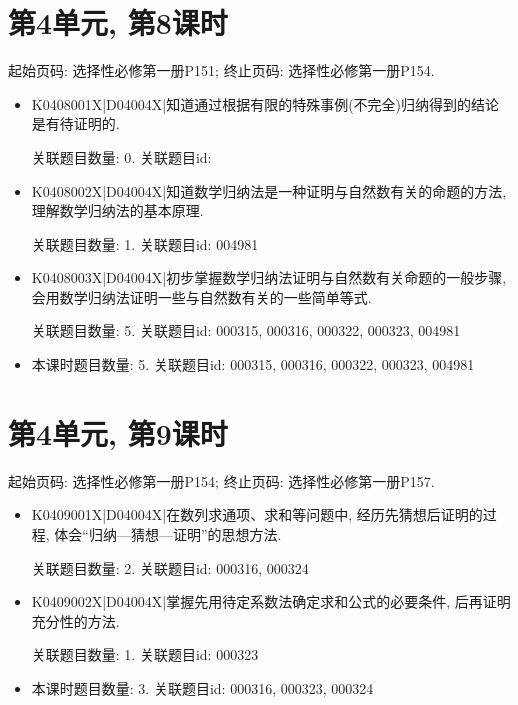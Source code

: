\section*{第4单元, 第8课时}
起始页码: 选择性必修第一册P151; 终止页码: 选择性必修第一册P154.
\begin{itemize}
\item K0408001X|D04004X|知道通过根据有限的特殊事例(不完全)归纳得到的结论是有待证明的.

关联题目数量: 0. 关联题目id: 

\item K0408002X|D04004X|知道数学归纳法是一种证明与自然数有关的命题的方法, 理解数学归纳法的基本原理.

关联题目数量: 1. 关联题目id: 004981

\item K0408003X|D04004X|初步掌握数学归纳法证明与自然数有关命题的一般步骤, 会用数学归纳法证明一些与自然数有关的一些简单等式.

关联题目数量: 5. 关联题目id: 000315, 000316, 000322, 000323, 004981

\item 本课时题目数量: 5. 关联题目id: 000315, 000316, 000322, 000323, 004981

\end{itemize}

\section*{第4单元, 第9课时}
起始页码: 选择性必修第一册P154; 终止页码: 选择性必修第一册P157.
\begin{itemize}
\item K0409001X|D04004X|在数列求通项、求和等问题中, 经历先猜想后证明的过程, 体会``归纳—猜想—证明''的思想方法.

关联题目数量: 2. 关联题目id: 000316, 000324

\item K0409002X|D04004X|掌握先用待定系数法确定求和公式的必要条件, 后再证明充分性的方法.

关联题目数量: 1. 关联题目id: 000323

\item 本课时题目数量: 3. 关联题目id: 000316, 000323, 000324

\end{itemize}

